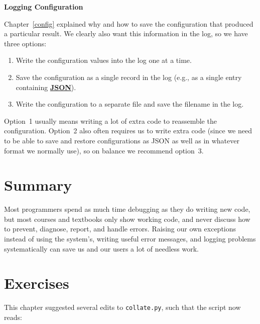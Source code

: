 \documentclass[
]{krantz}
\renewenvironment{quote}{\begin{VF}}{\end{VF}}
\newcommand{\gref}[2]{\hyperlink{#2}{\textbf{#1}}}
\begin{document}
\begin{quote}
\textbf{Logging Configuration}

Chapter~\ref{config} explained why and how
to save the configuration that produced a particular result.
We clearly also want this information in the log,
so we have three options:

\begin{enumerate}
\def\labelenumi{\arabic{enumi}.}
\item
  Write the configuration values into the log one at a time.
\item
  Save the configuration as a single record in the log
  (e.g., as a single entry containing \gref{JSON}{json}).
\item
  Write the configuration to a separate file
  and save the filename in the log.
\end{enumerate}

Option~1 usually means writing a lot of extra code to reassemble the configuration.
Option~2 also often requires us to write extra code
(since we need to be able to save and restore configurations as JSON
as well as in whatever format we normally use),
so on balance we recommend option~3.
\end{quote}

\hypertarget{errors-summary}{%
\section{Summary}\label{errors-summary}}

Most programmers spend as much time debugging as they do writing new code,
but most courses and textbooks only show working code,
and never discuss how to prevent, diagnose, report, and handle errors.
Raising our own exceptions instead of using the system's,
writing useful error messages,
and logging problems systematically
can save us and our users a lot of needless work.

\hypertarget{errors-exercises}{%
\section{Exercises}\label{errors-exercises}}

This chapter suggested several edits to \texttt{collate.py},
such that the script now reads:
\end{document}
